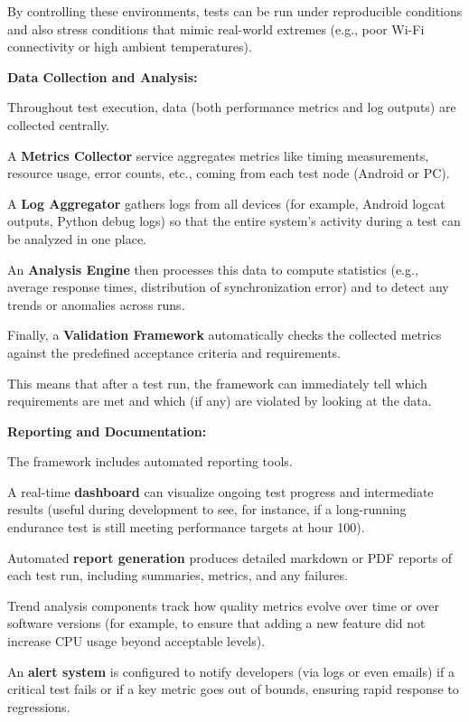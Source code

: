 {{By controlling these environments, tests can be run under reproducible conditions and
also stress conditions that mimic real-world extremes (e.g., poor Wi-Fi connectivity
or high ambient temperatures).

\textbf{Data Collection and Analysis:}

Throughout test execution, data (both performance metrics and log outputs) are
collected centrally.

A \textbf{Metrics Collector}
 service aggregates metrics like timing measurements, resource usage, error counts,
 etc., coming from each test node (Android or PC).

A \textbf{Log Aggregator}
 gathers logs from all devices (for example, Android logcat outputs, Python debug
 logs) so that the entire system's activity during a test can be analyzed in one
 place.

An \textbf{Analysis Engine}
 then processes this data to compute statistics (e.g., average response times,
 distribution of synchronization error) and to detect any trends or anomalies across
 runs.

Finally, a \textbf{Validation Framework}
 automatically checks the collected metrics against the predefined acceptance
 criteria and requirements.

This means that after a test run, the framework can immediately tell which
requirements are met and which (if any) are violated by looking at the data.

\textbf{Reporting and Documentation:}

The framework includes automated reporting tools.

A real-time \textbf{dashboard}
 can visualize ongoing test progress and intermediate results (useful during
 development to see, for instance, if a long-running endurance test is still meeting
 performance targets at hour 100).

Automated \textbf{report generation}
 produces detailed markdown or PDF reports of each test run, including summaries,
 metrics, and any failures.

Trend analysis components track how quality metrics evolve over time or over software
versions (for example, to ensure that adding a new feature did not increase CPU usage
beyond acceptable levels).

An \textbf{alert system}
 is configured to notify developers (via logs or even emails) if a critical test
 fails or if a key metric goes out of bounds, ensuring rapid response to regressions.

}}
